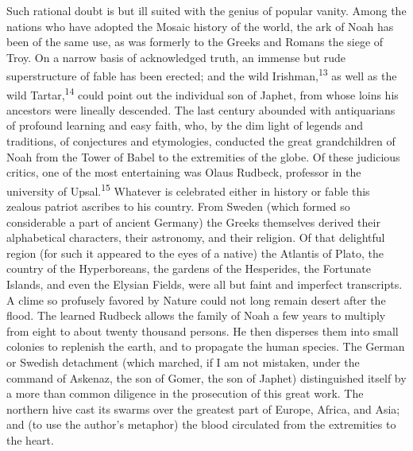 Such rational doubt is but ill suited with the genius of popular
vanity. Among the nations who have adopted the Mosaic history of
the world, the ark of Noah has been of the same use, as was
formerly to the Greeks and Romans the siege of Troy. On a narrow
basis of acknowledged truth, an immense but rude superstructure
of fable has been erected; and the wild Irishman,\textsuperscript{13} as well as
the wild Tartar,\textsuperscript{14} could point out the individual son of Japhet,
from whose loins his ancestors were lineally descended. The last
century abounded with antiquarians of profound learning and easy
faith, who, by the dim light of legends and traditions, of
conjectures and etymologies, conducted the great grandchildren of
Noah from the Tower of Babel to the extremities of the globe. Of
these judicious critics, one of the most entertaining was Olaus
Rudbeck, professor in the university of Upsal.\textsuperscript{15} Whatever is
celebrated either in history or fable this zealous patriot
ascribes to his country. From Sweden (which formed so
considerable a part of ancient Germany) the Greeks themselves
derived their alphabetical characters, their astronomy, and their
religion. Of that delightful region (for such it appeared to the
eyes of a native) the Atlantis of Plato, the country of the
Hyperboreans, the gardens of the Hesperides, the Fortunate
Islands, and even the Elysian Fields, were all but faint and
imperfect transcripts. A clime so profusely favored by Nature
could not long remain desert after the flood. The learned Rudbeck
allows the family of Noah a few years to multiply from eight to
about twenty thousand persons. He then disperses them into small
colonies to replenish the earth, and to propagate the human
species. The German or Swedish detachment (which marched, if I am
not mistaken, under the command of Askenaz, the son of Gomer, the
son of Japhet) distinguished itself by a more than common
diligence in the prosecution of this great work. The northern
hive cast its swarms over the greatest part of Europe, Africa,
and Asia; and (to use the author’s metaphor) the blood circulated
from the extremities to the heart.


